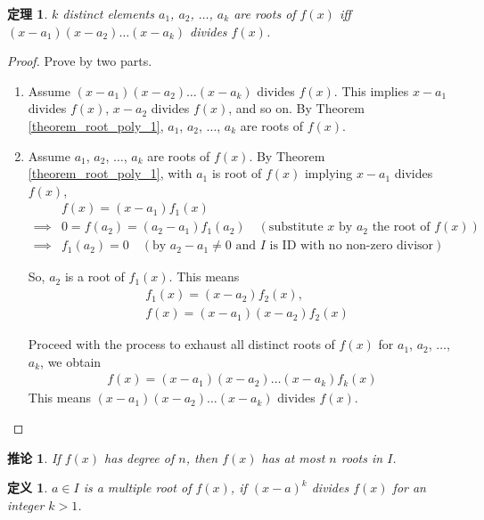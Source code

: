 \documentclass[utf8]{ctexbook}
\newtheorem{theorem}{定理}[section]
\newtheorem{definition}{定义}[section]
\newtheorem{corollary}{推论}[section]
\begin{document}
\begin{theorem}
$k$ distinct elements $a_1$, $a_2$, $\ldots$, $a_k$ are roots of $f(x)$ iff $(x-a_1) (x-a_2) \ldots (x-a_k)$ divides $f(x)$.
\end{theorem}

\begin{proof}
Prove by two parts.
\begin{enumerate}
\item{Assume $(x-a_1) (x-a_2) \ldots (x-a_k)$ divides $f(x)$. This implies $x-a_1$ divides $f(x)$, $x-a_2$ divides $f(x)$, and so on. By Theorem \ref{theorem_root_poly_1}, $a_1$, $a_2$, $\ldots$, $a_k$ are roots of $f(x)$.
}
\item{Assume $a_1$, $a_2$, $\ldots$, $a_k$ are roots of $f(x)$. By Theorem \ref{theorem_root_poly_1}, with $a_1$ is root of $f(x)$ implying $x-a_1$ divides $f(x)$,
\begin{align*}
& f(x) = (x-a_1) f_1 (x) \\
\implies & 0=  f(a_2) = (a_2 - a_1) f_1 (a_2) \quad (\mbox{substitute $x$ by $a_2$ the root of $f(x)$}) \\
\implies& f_1 (a_2) = 0 \quad (\mbox{by $a_2 - a_1 \neq 0$ and $I$ is ID with no non-zero divisor})
\end{align*}

So, $a_2$ is a root of $f_1 (x)$. This means
\begin{align*}
& f_1 (x) = (x-a_2) f_2 (x), \\
& f(x) = (x-a_1)(x-a_2)f_2 (x)
\end{align*}

Proceed with the process to exhaust all distinct roots of $f(x)$ for $a_1$, $a_2$, $\ldots$, $a_k$, we obtain
\begin{align*}
f(x) = (x-a_1) (x-a_2) \ldots (x-a_k) f_k (x)
\end{align*}
This means $(x-a_1) (x-a_2) \ldots (x-a_k)$ divides $f(x)$.
}
\end{enumerate}
\end{proof}

\begin{corollary}\label{corollary_3_6_1_n_degree_n_roots}
If $f(x)$ has degree of $n$, then $f(x)$ has at most $n$ roots in $I$.
\end{corollary}


\begin{definition}
\label{def_root_poly_multiple_root}
$a \in I$ is a multiple root of $f(x)$, if $(x-a)^k$ divides $f(x)$ for an integer $k > 1$.
\end{definition}
\end{document}
